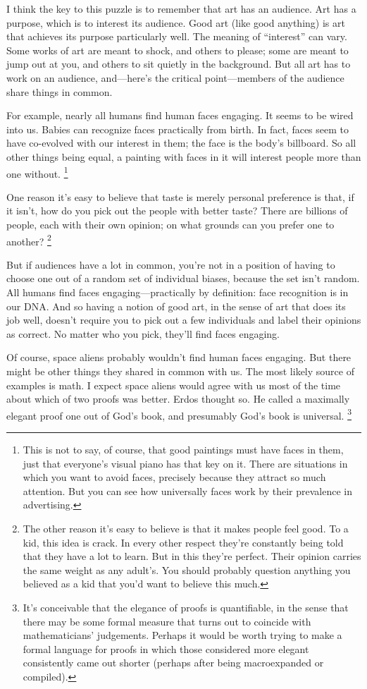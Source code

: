 \documentclass[12pt]{book}
\begin{document}
I think the key to this puzzle is to remember that art has an audience.
Art has a purpose, which is to interest its audience. Good art (like
good anything) is art that achieves its purpose particularly well. The
meaning of ``interest'' can vary. Some works of art are meant to shock,
and others to please; some are meant to jump out at you, and others to
sit quietly in the background. But all art has to work on an audience,
and---here's the critical point---members of the audience share things
in common.

For example, nearly all humans find human faces engaging. It seems to be
wired into us. Babies can recognize faces practically from birth. In
fact, faces seem to have co-evolved with our interest in them; the face
is the body's billboard. So all other things being equal, a painting
with faces in it will interest people more than one without.
\footnote{This is not to say, of course, that good paintings must have
faces in them, just that everyone's visual piano has that key on it.
There are situations in which you want to avoid faces, precisely because
they attract so much attention. But you can see how universally faces
work by their prevalence in advertising.}

One reason it's easy to believe that taste is merely personal preference
is that, if it isn't, how do you pick out the people with better taste?
There are billions of people, each with their own opinion; on what
grounds can you prefer one to another? \footnote{The other reason it's easy to believe is that it makes people
feel good. To a kid, this idea is crack. In every other respect they're
constantly being told that they have a lot to learn. But in this they're
perfect. Their opinion carries the same weight as any adult's. You
should probably question anything you believed as a kid that you'd want
to believe this much.}

But if audiences have a lot in common, you're not in a position of
having to choose one out of a random set of individual biases, because
the set isn't random. All humans find faces engaging---practically by
definition: face recognition is in our DNA. And so having a notion of
good art, in the sense of art that does its job well, doesn't require
you to pick out a few individuals and label their opinions as correct.
No matter who you pick, they'll find faces engaging.

Of course, space aliens probably wouldn't find human faces engaging. But
there might be other things they shared in common with us. The most
likely source of examples is math. I expect space aliens would agree
with us most of the time about which of two proofs was better. Erdos
thought so. He called a maximally elegant proof one out of God's book,
and presumably God's book is universal. \footnote{It's conceivable that the elegance of proofs is quantifiable, in
the sense that there may be some formal measure that turns out to
coincide with mathematicians' judgements. Perhaps it would be worth
trying to make a formal language for proofs in which those considered
more elegant consistently came out shorter (perhaps after being
macroexpanded or compiled).}
\end{document}
